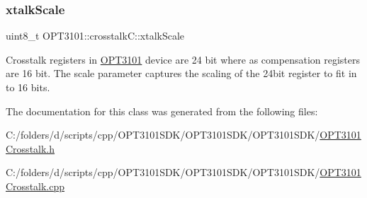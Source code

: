 \mbox{\label{class_o_p_t3101_1_1crosstalk_c_a5a5c560e1f5db427c02863a9618d9fa4}} 
\subsubsection{\texorpdfstring{xtalk\+Scale}{xtalkScale}}
{\footnotesize\ttfamily uint8\+\_\+t O\+P\+T3101\+::crosstalk\+C\+::xtalk\+Scale}



Crosstalk registers in \mbox{\hyperlink{namespace_o_p_t3101}{O\+P\+T3101}} device are 24 bit where as compensation registers are 16 bit. The scale parameter captures the scaling of the 24bit register to fit in to 16 bits. 



The documentation for this class was generated from the following files\+:\begin{DoxyCompactItemize}
\item 
C\+:/folders/d/scripts/cpp/\+O\+P\+T3101\+S\+D\+K/\+O\+P\+T3101\+S\+D\+K/\+O\+P\+T3101\+S\+D\+K/\mbox{\hyperlink{_o_p_t3101_crosstalk_8h}{O\+P\+T3101\+Crosstalk.\+h}}\item 
C\+:/folders/d/scripts/cpp/\+O\+P\+T3101\+S\+D\+K/\+O\+P\+T3101\+S\+D\+K/\+O\+P\+T3101\+S\+D\+K/\mbox{\hyperlink{_o_p_t3101_crosstalk_8cpp}{O\+P\+T3101\+Crosstalk.\+cpp}}\end{DoxyCompactItemize}
